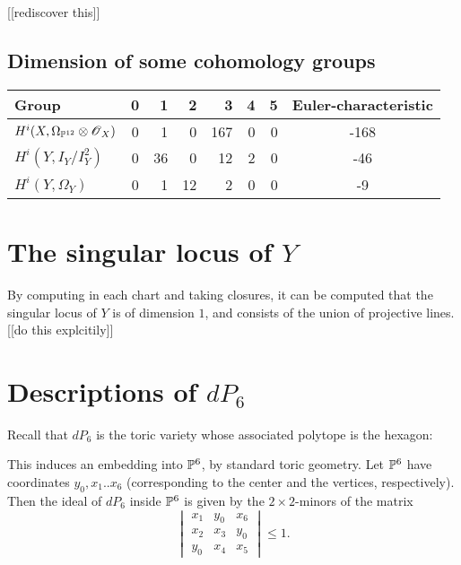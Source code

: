 \documentclass[11pt, english]{article}
\begin{document}
[[rediscover this]]

\subsection{Dimension of some cohomology groups}

\begin{tabular}{ l || c | r | r | r | r | r | c  }
 Group & 0 & 1 & 2 & 3 & 4 & 5 & Euler-characteristic \\
\hline
$H^i(X, \Omega_{\mathbb{P}^{12}} \otimes \operatorname{\mathscr{O}}_X)$ & 0 & 1 & 0 & 167 & 0 & 0 & -168\\
$H^i(Y, I_Y/I_Y^2)$ & 0 & 36 & 0 & 12 & 2 & 0 & -46 \\
$H^i(Y, \Omega_Y)$ & 0 & 1  & 12 & 2 & 0  & 0 & -9
\end{tabular}


\section{The singular locus of $Y$}

By computing in each chart and taking closures, it can be computed that the singular locus of $Y$ is of dimension $1$, and consists of the union of 
projective lines. [[do this explcitily]]

\section{Descriptions of $dP_6$}

Recall that $dP_6$ is the toric variety whose associated polytope is the hexagon:
 
\begin{center}
\end{center}


This induces an embedding into $\mathbb{P}^6$, by standard toric geometry. Let $\mathbb{P}^6$ have coordinates $y_0,x_1..x_6$ (corresponding to the center and the vertices, respectively). Then the ideal of $dP_6$ inside $\mathbb{P}^6$ is given by the $2 \times 2$-minors of the matrix
\begin{equation}
\label{eqdp6}
\begin{vmatrix}
x_1 & y_0 & x_6 \\
x_2 & x_3 & y_0 \\
y_0 & x_4 & x_5
\end{vmatrix} \leq 1.
\end{equation}
\end{document}
